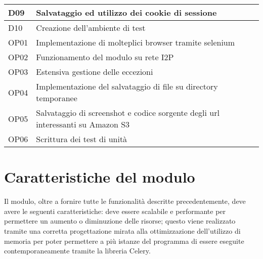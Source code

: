 \begin{longtable}{|p{}|p{}|}
    \hline
    D09			&	Salvataggio ed utilizzo dei cookie di sessione \\
    \hline
    D10			&	Creazione dell'ambiente di test \\
    \hline
    OP01		&	Implementazione di molteplici browser tramite selenium \\
    \hline
    OP02		&	Funzionamento del modulo su rete I2P \\
    \hline
    OP03		&	Estensiva gestione delle eccezioni \\
    \hline
    OP04		&	Implementazione del salvataggio di file su directory temporanee \\
    \hline
    OP05		&	Salvataggio di screenshot e codice sorgente degli url interessanti su Amazon S3 \\
    \hline
    OP06		&	Scrittura dei test di unità \\
    \hline
\end{longtable}%

\section{Caratteristiche del modulo}

Il modulo, oltre a fornire tutte le funzionalità descritte precedentemente, deve avere le
seguenti caratteristiche: deve essere scalabile e performante per permettere un aumento o diminuzione delle risorse; questo viene realizzato tramite una corretta progettazione mirata alla ottimizzazione dell'utilizzo di memoria per poter permettere a più istanze del programma di essere eseguite contemporaneamente tramite la libreria Celery.